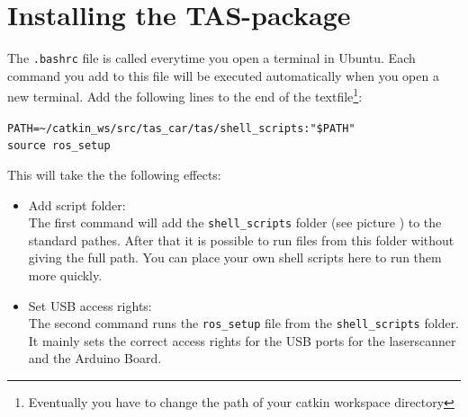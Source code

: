 \section{Installing the TAS-package}
\label{sec:tas_package_install 

As it was mentioned in the previous chapter the TAS-package can be found on GitHub. To install it open a terminal and switch to your catkin workspace directory. In this example we assume your working directory in \texttt{\textasciitilde/catkin\_ws}. To get and build the package on your car type in:

\shellcmd{cd \textasciitilde/catkin\_ws/src}\\
\shellcmd{git clone https://github.com/LSR-TAS/tas\_car}\\
\shellcmd{cd ..}\\
\shellcmd{catkin\_make}\\

If there occured no errors, the package has been built and the car is now ready to run. Before running anything you should also do the following preparations to make your work in the terminal a little more comfortable: 
\\
Open a terminal and type in:

\shellcmd{sudo gedit \textasciitilde/.bashrc}}

The \texttt{.bashrc} file is called everytime you open a terminal in Ubuntu. Each command you add to this file will be executed automatically when you open a new terminal. Add the following lines to the end of the textfile\footnote{Eventually you have to change the path of your catkin workspace directory}: 

\texttt{PATH=\textasciitilde/catkin\_ws/src/tas\_car/tas/shell\_scripts:"\$PATH"}\\
\texttt{source ros\_setup}\\


This will take the the following effects:

\begin{itemize}
\item Add script folder:\\
The first command will add the \texttt{shell\_scripts} folder (see picture ) to the standard pathes. After that it is possible to run files from this folder without giving the full path. You can place your own shell scripts here to run them more quickly.

\item Set USB access rights:\\
The second command runs the \texttt{ros\_setup} file from the \texttt{shell\_scripts} folder. It mainly sets the correct access rights for the USB ports for the laserscanner and the Arduino Board.
\end{itemize}


